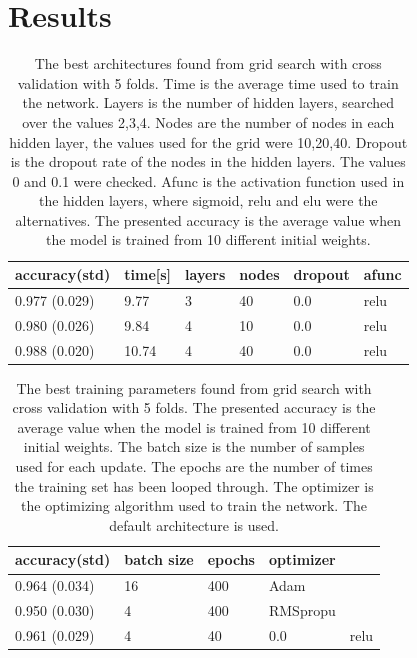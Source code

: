 \documentclass[prl,twocolumn]{revtex4-1}
\begin{document}
\section{Results}
\begin{table}[!b]
\begin{center}
\begin{tabular}{llllll}
\hline
accuracy(std) & time[s] & layers & nodes & dropout & afunc \\
\hline
0.977 (0.029) & 9.77 & 3 & 40 & 0.0 & relu\\
0.980 (0.026) & 9.84 & 4 & 10 & 0.0 & relu\\
0.988 (0.020) & 10.74 & 4 & 40 & 0.0& relu\\
\hline
\end{tabular}
\end{center}
\caption{The best architectures found from grid search with cross validation with 5 folds. Time is the average time used to train the network. Layers is the number of hidden layers, searched over the values 2,3,4. Nodes are the number of nodes in each hidden layer, the values used for the grid were 10,20,40. Dropout is the dropout rate of the nodes in the hidden layers. The values 0 and 0.1 were checked. Afunc is the activation function used in the hidden layers, where sigmoid, relu and elu were the alternatives. The presented accuracy is the average value when the model is trained from 10 different initial weights.}
\label{tab:grid_search_architecture}
\end{table}


\begin{table}[!b]
\begin{center}
\begin{tabular}{lllll}
\hline
accuracy(std) & batch size & epochs & optimizer \\
\hline
0.964 (0.034) & 16 & 400 & Adam\\
0.950 (0.030) & 4 & 400 & RMSpropu\\
0.961 (0.029) & 4 & 40 & 0.0& relu\\
\hline
\end{tabular}
\end{center}
\caption{The best training parameters found from grid search with cross validation with 5 folds. The presented accuracy is the average value when the model is trained from 10 different initial weights. The batch size is the number of samples used for each update. The epochs are the number of times the training set has been looped through. The optimizer is the optimizing algorithm used to train the network. The default architecture is used.}
\label{tab:grid_search_training}
\end{table}
\end{document}
